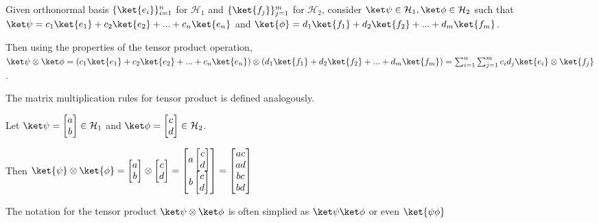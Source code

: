 \begin{note}
    Given orthonormal basis $\{ \ket{e_i} \}_{i=1}^n$ for $\mathcal{H}_1$ and $\{ \ket{f_j} \}_{j=1}^m$ for $\mathcal{H}_2$, consider $\ket\psi \in \mathcal{H}_1, \ket\phi \in \mathcal{H}_2$ such that $\ket\psi = c_1 \ket{e_1} + c_2 \ket{e_2} + ... + c_n \ket{e_n}$ and $\ket{\phi} = d_1 \ket{f_1} + d_2 \ket{f_2} + ... + d_m \ket{f_m}$.

    Then using the properties of the tensor product operation, $\ket\psi \otimes \ket\phi = ( c_1 \ket{e_1} + c_2 \ket{e_2} + ... + c_n \ket{e_n} ) \otimes (d_1 \ket{f_1} + d_2 \ket{f_2} + ... + d_m \ket{f_m}) = \sum_{i=1}^n \sum_{j=1}^m c_i d_j \ket{e_i} \otimes \ket{f_j}$.

    The matrix multiplication rules for tensor product is defined analogously. 

    Let $\ket\psi = \begin{bmatrix} a \\ b \end{bmatrix} \in \mathcal{H}_1$ and $\ket\phi = \begin{bmatrix} c \\ d \end{bmatrix} \in \mathcal{H}_2$.

        Then $\ket{\psi} \otimes \ket{\phi} = \begin{bmatrix} a \\ b \end{bmatrix} \otimes \begin{bmatrix} c \\ d \end{bmatrix} = \begin{bmatrix} a \begin{bmatrix} c \\ d \end{bmatrix} \\ b \begin{bmatrix} c \\ d \end{bmatrix} \end{bmatrix} = \begin{bmatrix} ac \\ ad \\ bc \\ bd \end{bmatrix}$
\end{note}

\begin{note}
    The notation for the  tensor product $\ket\psi \otimes \ket\phi$ is often simplied as $\ket\psi \ket\phi$ or even $\ket{\psi\phi}$
\end{note}

